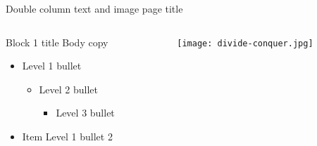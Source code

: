 \documentclass[t]{beamer}
\begin{document}
\begin{frame}{Double column text and image page title}
	\begin{columns}[T,totalwidth=\textwidth]
  		\begin{column}{0.45\textwidth}
  			\begin{block}{Block 1 title}
    				Body copy
    				\begin{itemize}    
    					\item Level 1 bullet
  					\begin{itemize}
  						\item Level 2 bullet
  						\begin{itemize}
  							\item Level 3 bullet
  						\end{itemize}
  					\end{itemize}
    					\item Item Level 1 bullet 2
    				\end{itemize}  
			\end{block}
  		\end{column} %
  		\begin{column}{0.45\textwidth}
			\begin{figure}
				\vspace{-\blocktitlesize}
				\texttt{[image: divide-conquer.jpg]}
			\end{figure}
  		\end{column}%
	\end{columns}
\end{frame}
\end{document}
